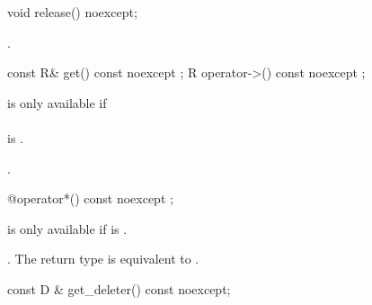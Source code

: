 \documentclass[ebook,11pt,article]{memoir}
\begin{document}

\begin{itemdecl}
void release() noexcept;
\end{itemdecl}

\begin{itemdescr}
\pnum
\effects {}.
\end{itemdescr}


\begin{itemdecl}
const R& get() const noexcept ;
R operator->() const noexcept ;
\end{itemdecl}

\begin{itemdescr}
\pnum
\remarks
{} is only available if \\
\\
 is . 

\pnum
\returns {}.
\end{itemdescr}

\begin{itemdecl}
@\seebelow@ operator*() const noexcept ;
\end{itemdecl}

\begin{itemdescr}
\pnum
\remarks {} is only available if  is .

\pnum
\returns {}. \enternote The return type is equivalent to 
. \exitnote
\end{itemdescr}


\begin{itemdecl}
const D & get_deleter() const noexcept;
\end{itemdecl}

\begin{itemdescr}
\pnum
\returns {}
\end{itemdescr}

\end{document}
